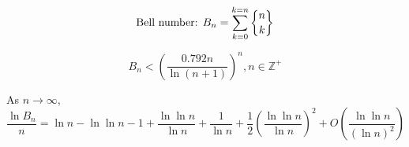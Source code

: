 \begin{frame}{}
  \[
    \text{Bell number: } B_n = \sum_{k=0}^{k=n} \stirling{n}{k}
  \]

  \pause
  \begin{theorem}
    \[
      B_n < \left( \frac{0.792 n}{\ln( n+1)} \right)^n, n \in \mathbb{Z}^{+}
    \]
  \end{theorem}

  \pause
  \vspace{0.50cm}
  \begin{theorem}[de Bruijn (1981)]
    As $n \to \infty$,
    \[
      \frac{\ln B_n}{n} = \ln n - \ln \ln n - 1 + \frac{\ln \ln n}{\ln n} + \frac{1}{\ln n} 
      + \frac{1}{2}\left(\frac{\ln \ln n}{\ln n}\right)^2 + O\left(\frac{\ln \ln n}{(\ln n)^2} \right)
    \]
  \end{theorem}
\end{frame}

\begin{frame}{}
\end{frame}
